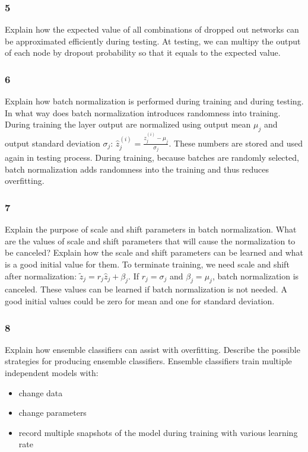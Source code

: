 \documentclass{article}
\begin{document}
\subsubsection*{5}
\begin{myleftlinebox}
    Explain how the expected value of all combinations of dropped out networks can be approximated efficiently during testing.
    \tcblower
    At testing, we can multipy the output of each node by dropout probability so that it equals to the expected value.
\end{myleftlinebox}

\subsubsection*{6}
\begin{myleftlinebox}
    Explain how batch normalization is performed during training and during testing. In what way does batch normalization introduces randomness into training.
    \tcblower
    During training the layer output are normalized using output mean \(\mu_j\) and output  standard deviation \(\sigma_j\): \(\hat z_j^{(i)}=\frac{z_j^{(i)}-\mu_j}{\sigma_j}\). These numbers are stored and used again in testing process.
    During training, because batches are randomly selected, batch normalization adds randomness into the training and thus reduces overfitting.
\end{myleftlinebox}

\subsubsection*{7}
\begin{myleftlinebox}
    Explain the purpose of scale and shift parameters in batch normalization. What are the values of scale and shift parameters that will cause the normalization to be canceled? Explain how the scale and shift parameters can be learned and what is a good initial value for them.
    \tcblower
    To terminate training, we need scale and shift after normalization: \(\tilde z_j=r_j \hat z_j+\beta_j\). If \(r_j=\sigma_j\) and \(\beta_j=\mu_j\), batch normalization is canceled.
    These values can be learned if batch normalization is not needed. A good initial values could be zero for mean and one for standard deviation.
\end{myleftlinebox}

\subsubsection*{8}
\begin{myleftlinebox}
    Explain how ensemble classifiers can assist with overfitting. Describe the possible strategies for producing ensemble classifiers.
    \tcblower
    Ensemble classifiers train multiple independent models with:
    \begin{itemize}
        \item change data
        \item change parameters
        \item record multiple snapshots of the model during training with various learning rate
    \end{itemize}    
\end{myleftlinebox}
\end{document}
